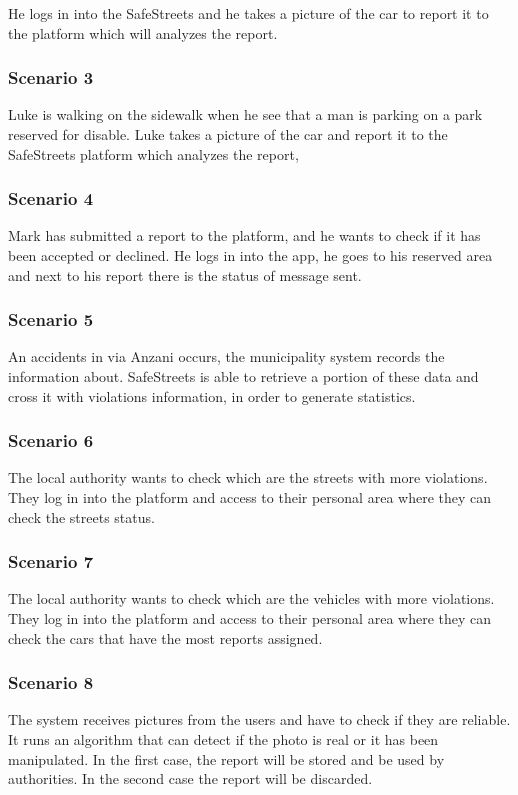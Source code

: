 He logs in into the SafeStreets and he takes a picture of the car to report it to the platform which will analyzes the report.

\subsubsection{Scenario 3}
Luke is walking on the sidewalk when he see that a man is parking on a park reserved for disable.
Luke takes a picture of the car and report it to the SafeStreets platform which analyzes the report,

\subsubsection{Scenario 4}
Mark has submitted a report to the platform, and he wants to check if it has been accepted or declined.
He logs in into the app, he goes to his reserved area and next to his report there is the status of message sent.

\subsubsection{Scenario 5}
An accidents in via Anzani occurs, the municipality system records the information about.
SafeStreets is able to retrieve a portion of these data and cross it with violations information, in order to generate statistics.

\subsubsection{Scenario 6}
The local authority wants to check which are the streets with more violations. They log in into the platform and access to their personal area where they can check the streets status.
 
\subsubsection{Scenario 7}
The local authority wants to check which are the vehicles with more violations. They log in into the platform and access to their personal area where they can check the cars that have the most reports assigned.

\subsubsection{Scenario 8}
The system receives pictures from the users and have to check if they are reliable. It runs an algorithm that can detect if the photo is real or it has been manipulated. In the first case, the report will be stored and be used by authorities. In the second case the report will be discarded.


